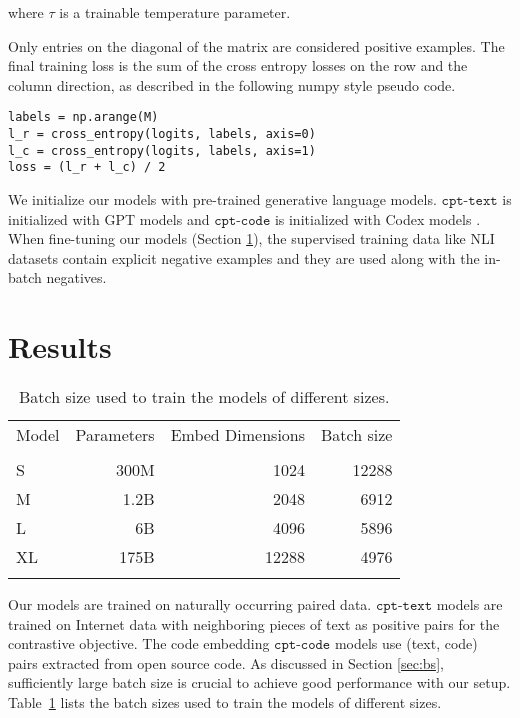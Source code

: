 \documentclass[nohyperref]{article}
\begin{document}
where $\tau$ is a trainable temperature parameter.

Only entries on the diagonal of the matrix are considered positive examples. The final training loss is the sum of the cross entropy losses on the row and the column direction, as described in the following numpy style pseudo code.



\begin{small}
\begin{verbatim}
labels = np.arange(M)
l_r = cross_entropy(logits, labels, axis=0)
l_c = cross_entropy(logits, labels, axis=1)
loss = (l_r + l_c) / 2
\end{verbatim}
\end{small}

We initialize our models with pre-trained generative language models. $\texttt{cpt-text}$ is initialized with GPT models \cite{gpt-3} and $\texttt{cpt-code}$ is initialized with Codex models \cite{codex}. When fine-tuning our models (Section \ref{sec:results}), the supervised training data like NLI datasets contain explicit negative examples and they are used along with the in-batch negatives. 

\section{Results}
\label{sec:results}

\begin{table}[]
\centering

\setlength{\tabcolsep}{4.5pt}
\begin{tabular}{l|r|r|r}
\Xhline{2.5\arrayrulewidth}
Model & Parameters &  Embed Dimensions & Batch size  \\ 
\Xhline{1\arrayrulewidth} & \\[-1.5ex]
S & 300M  & 1024 & 12288 \\ 
M & 1.2B  & 2048 & 6912 \\ 
L & 6B & 4096  & 5896 \\ 
XL & 175B  & 12288 & 4976 \\ 
\Xhline{2.5\arrayrulewidth}
\end{tabular}
\caption{Batch size used to train the models of different sizes.}
\label{table:bs}
\end{table}

Our models are trained on naturally occurring paired data. $\texttt{cpt-text}$ models are trained on Internet data with neighboring pieces of text as positive pairs for the contrastive objective. The code embedding $\texttt{cpt-code}$ models use (text, code) pairs extracted from open source code. As discussed in Section \ref{sec:bs}, sufficiently large batch size is crucial to achieve good performance with our setup. Table~\ref{table:bs} lists the batch sizes used to train the models of different sizes. 
\end{document}
